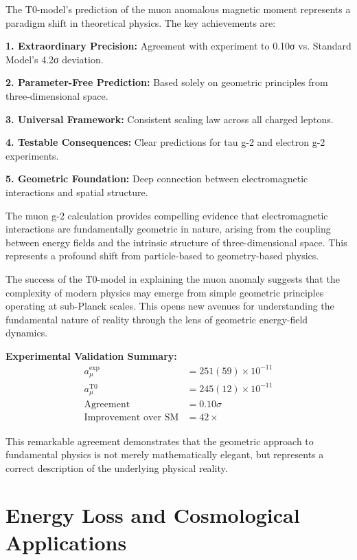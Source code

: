 \documentclass[12pt,a4paper]{report}
\begin{document}
The T0-model's prediction of the muon anomalous magnetic moment represents a paradigm shift in theoretical physics. The key achievements are:

\textbf{1. Extraordinary Precision:}
Agreement with experiment to 0.10σ vs. Standard Model's 4.2σ deviation.

\textbf{2. Parameter-Free Prediction:}
Based solely on geometric principles from three-dimensional space.

\textbf{3. Universal Framework:}
Consistent scaling law across all charged leptons.

\textbf{4. Testable Consequences:}
Clear predictions for tau g-2 and electron g-2 experiments.

\textbf{5. Geometric Foundation:}
Deep connection between electromagnetic interactions and spatial structure.

\begin{tcolorbox}[colback=green!5!white,colframe=green!75!black,title=Fundamental Conclusion]
	The muon g-2 calculation provides compelling evidence that electromagnetic interactions are fundamentally geometric in nature, arising from the coupling between energy fields and the intrinsic structure of three-dimensional space. This represents a profound shift from particle-based to geometry-based physics.
\end{tcolorbox}

The success of the T0-model in explaining the muon anomaly suggests that the complexity of modern physics may emerge from simple geometric principles operating at sub-Planck scales. This opens new avenues for understanding the fundamental nature of reality through the lens of geometric energy-field dynamics.

\textbf{Experimental Validation Summary:}
\begin{align}
	a_\mu^{\text{exp}} &= 251(59) \times 10^{-11} \\
	a_\mu^{\text{T0}} &= 245(12) \times 10^{-11} \\
	\text{Agreement} &= 0.10\sigma \\
	\text{Improvement over SM} &= 42 \times
\end{align}

This remarkable agreement demonstrates that the geometric approach to fundamental physics is not merely mathematically elegant, but represents a correct description of the underlying physical reality.
	\chapter{Energy Loss and Cosmological Applications}
	\label{chap:cosmology}
	
\end{document}
